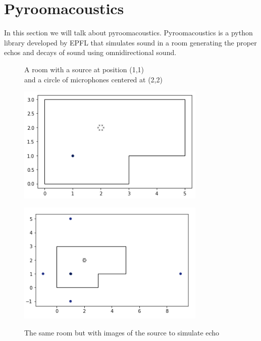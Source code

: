\section{Pyroomacoustics}

In this section we will talk about pyroomacoustics. Pyroomacoustics is a python library developed by EPFL that simulates sound in a room generating the proper echos and decays of sound using omnidirectional sound. 

\begin{figure}[h]
\centering
\begin{minipage}{.5\textwidth}
    \caption{A room with a source at position (1,1)\\ and a circle of microphones centered at (2,2)}
    \centering
    \label{fig:room}
    \includegraphics[width=0.8\textwidth]{room.png}
\end{minipage}%
\begin{minipage}{.5\textwidth}
    \caption{The same room but with images of the source to simulate echo}
    \centering
    \label{fig:roomImages}
    \includegraphics[width=0.8\textwidth]{roomWithImages.png}
\end{minipage}
\end{figure}

